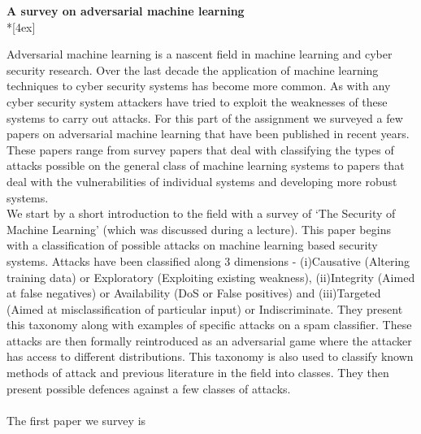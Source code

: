 \documentclass[11pt]{article}
\begin{document}
\thispagestyle{empty}
\parindent 0pt
\vfill
\large

\begin{center}
\LARGE{\bf \textsf{A survey on adversarial machine learning}} \\*[4ex]
\end{center}
Adversarial machine learning is a nascent field in machine learning and cyber security research. Over the last decade the application of machine learning techniques to cyber security systems has become more common. As with any cyber security system attackers have tried to exploit the weaknesses of these systems to carry out attacks. For this part of the assignment we surveyed a few papers on adversarial machine learning that have been published in recent years. These papers range from survey papers that deal with classifying the types of attacks possible on the general class of machine learning systems to papers that deal with the vulnerabilities of individual systems and developing more robust systems. \\
We start by a short introduction to the field with a survey of `The Security of Machine Learning' (which was discussed during a lecture). This paper begins with a classification of possible attacks on machine learning based security systems. Attacks have been classified along 3 dimensions - (i)Causative (Altering training data) or Exploratory (Exploiting existing weakness), (ii)Integrity (Aimed at false negatives) or Availability (DoS or False positives) and (iii)Targeted (Aimed at misclassification of particular input) or Indiscriminate. They present this taxonomy along with examples of specific attacks on a spam classifier. These attacks are then formally reintroduced as an adversarial game where the attacker has access to different distributions. This taxonomy is also used to classify known methods of attack and previous literature in the field into classes. They then present possible defences against a few classes of attacks.  \\ \\
The first paper we survey is
\\ \\
\end{document}
